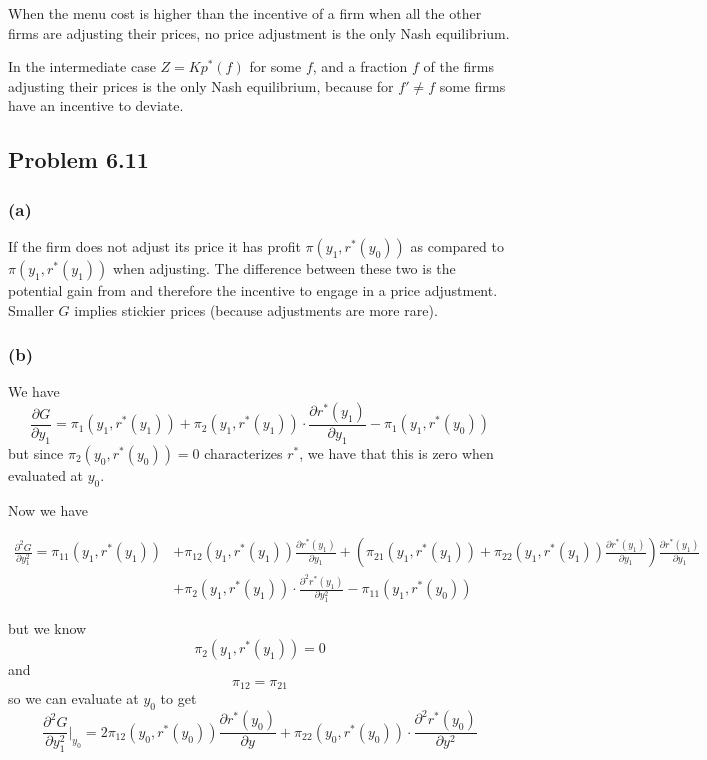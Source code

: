 \documentclass[12pt]{article}
\begin{document}
	When the menu cost is higher than the incentive of a firm when all the other firms are adjusting their prices, no price adjustment is the only Nash equilibrium. 
	
	In the intermediate case $Z = K p^{*} (f)$ for some $f$, and a fraction $f$ of the firms adjusting their prices is the only Nash equilibrium, because for $f' \neq f$ some firms have an incentive to deviate. 

\subsection{Problem 6.11}

\subsubsection*{(a)}
If the firm does not adjust its price it has profit $\pi \left( y_1, r^{*}(y_0)  \right)$ as compared to $\pi \left( y_1, r^{*}(y_1)  \right)$ when adjusting. 
The difference between these two is the potential gain from and therefore the incentive to engage in a price adjustment.
Smaller $G$ implies stickier prices (because adjustments are more rare). 

\subsubsection*{(b)}

We have
\[
\frac{\partial G}{\partial y_1} = \pi_1(y_1, r^*(y_1)) + \pi_2(y_1, r^*(y_1)) \cdot \frac{\partial r^*(y_1)}{\partial y_1} - \pi_1(y_1, r^*(y_0))
\]
but since $\pi_2(y_0, r^*(y_0)) = 0$ characterizes $r^*$, we have that this is zero when evaluated at $y_0$.

Now we have
\begin{tiny}
\begin{align*}
\frac{\partial^2 G}{\partial y_1^2} = \pi_{11}(y_1, r^*(y_1))  &+ \pi_{12}(y_1, r^*(y_1)) \frac{\partial r^*(y_1)}{\partial y_1} + \left(\pi_{21}(y_1, r^*(y_1)) + \pi_{22}(y_1, r^*(y_1)) \frac{\partial r^*(y_1)}{\partial y_1} \right) \frac{\partial r^*(y_1)}{\partial y_1} \\&+ \pi_2(y_1, r^*(y_1)) \cdot \frac{\partial^2 r^*(y_1)}{\partial y_1^2} - \pi_11(y_1, r^*(y_0))
\end{align*}
\end{tiny}
but we know
\[
\pi_2(y_1, r^*(y_1)) = 0
\]
and 
\[
\pi_{12} = \pi_{21}
\]
so we can evaluate at $y_0$ to get
\[
\frac{\partial^2 G}{\partial y_1^2} \vert_{y_0} = 2 \pi_{12}(y_0, r^*(y_0)) \frac{\partial r^*(y_0)}{\partial y} + \pi_{22}(y_0, r^*(y_0)) \cdot \frac{\partial^2 r^*(y_0)}{\partial y^2}
\]
\end{document}
